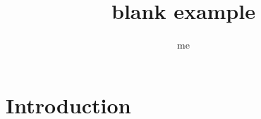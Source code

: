 \documentclass{article}
\title{blank example}
\author{me}
\begin{document}
\maketitle

\section{Introduction}
\end{document}
